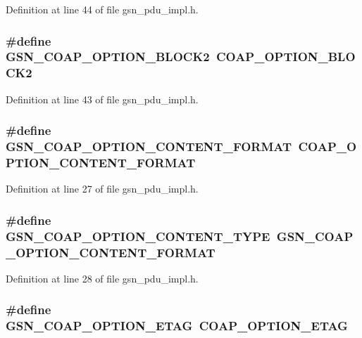 Definition at line 44 of file gsn\_\-pdu\_\-impl.h.

\hypertarget{a00538_af2202534af3538e184f5bf062ec59b5e}{
\subsubsection[{GSN\_\-COAP\_\-OPTION\_\-BLOCK2}]{\setlength{\rightskip}{0pt plus 5cm}\#define GSN\_\-COAP\_\-OPTION\_\-BLOCK2~COAP\_\-OPTION\_\-BLOCK2}}
\label{a00538_af2202534af3538e184f5bf062ec59b5e}


Definition at line 43 of file gsn\_\-pdu\_\-impl.h.

\hypertarget{a00538_aa19d2afe3a44f4b52b219f5dc38ae596}{
\subsubsection[{GSN\_\-COAP\_\-OPTION\_\-CONTENT\_\-FORMAT}]{\setlength{\rightskip}{0pt plus 5cm}\#define GSN\_\-COAP\_\-OPTION\_\-CONTENT\_\-FORMAT~COAP\_\-OPTION\_\-CONTENT\_\-FORMAT}}
\label{a00538_aa19d2afe3a44f4b52b219f5dc38ae596}


Definition at line 27 of file gsn\_\-pdu\_\-impl.h.

\hypertarget{a00538_ac31fe808c646a28285bbfb171de94833}{
\subsubsection[{GSN\_\-COAP\_\-OPTION\_\-CONTENT\_\-TYPE}]{\setlength{\rightskip}{0pt plus 5cm}\#define GSN\_\-COAP\_\-OPTION\_\-CONTENT\_\-TYPE~GSN\_\-COAP\_\-OPTION\_\-CONTENT\_\-FORMAT}}
\label{a00538_ac31fe808c646a28285bbfb171de94833}


Definition at line 28 of file gsn\_\-pdu\_\-impl.h.

\hypertarget{a00538_a8030e10c58d5b7729a877e21680dee56}{
\subsubsection[{GSN\_\-COAP\_\-OPTION\_\-ETAG}]{\setlength{\rightskip}{0pt plus 5cm}\#define GSN\_\-COAP\_\-OPTION\_\-ETAG~COAP\_\-OPTION\_\-ETAG}}
\label{a00538_a8030e10c58d5b7729a877e21680dee56}


